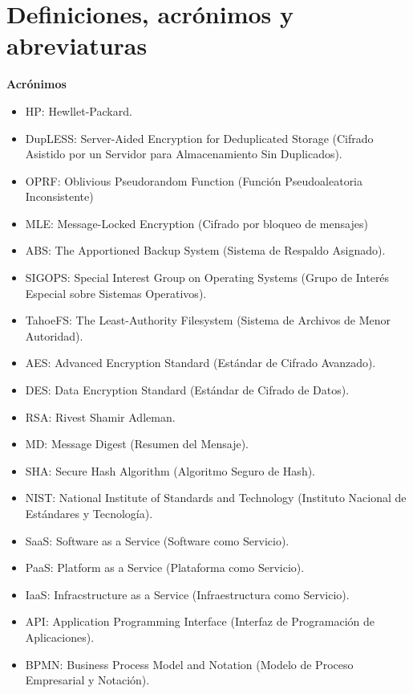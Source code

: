 \section{Definiciones, acrónimos y abreviaturas}

\textbf{Acrónimos}
\begin{itemize}
\item HP: Hewllet-Packard.
\item DupLESS: Server-Aided Encryption for Deduplicated Storage (Cifrado Asistido por un Servidor para Almacenamiento Sin Duplicados).
\item OPRF: Oblivious Pseudorandom Function (Función Pseudoaleatoria Inconsistente)
\item MLE: Message-Locked Encryption (Cifrado por bloqueo de mensajes)
\item ABS: The Apportioned Backup System (Sistema de Respaldo Asignado).
\item SIGOPS: Special Interest Group on Operating Systems (Grupo de Interés Especial sobre Sistemas Operativos).
\item TahoeFS: The Least-Authority Filesystem (Sistema de Archivos de Menor Autoridad).
\item AES: Advanced Encryption Standard (Estándar de Cifrado Avanzado).
\item DES: Data Encryption Standard (Estándar de Cifrado de Datos).
\item RSA: Rivest Shamir Adleman.
\item MD: Message Digest (Resumen del Mensaje).
\item SHA: Secure Hash Algorithm (Algoritmo Seguro de Hash).
\item NIST: National Institute of Standards and Technology (Instituto Nacional de Estándares y Tecnología).
\item SaaS: Software as a Service (Software como Servicio).
\item PaaS: Platform as a Service (Plataforma como Servicio).
\item IaaS: Infracstructure as a Service (Infraestructura como Servicio).
\item API: Application Programming Interface (Interfaz de Programación de Aplicaciones).
\item BPMN: Business Process Model and Notation (Modelo de Proceso Empresarial y Notación). 
\end{itemize}


